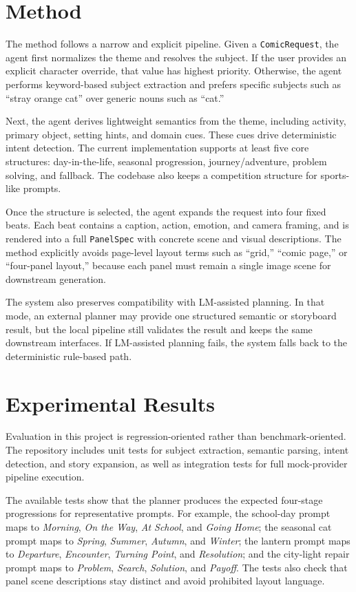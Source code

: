 \documentclass[11pt]{article}
\begin{document}
\section{Method}
The method follows a narrow and explicit pipeline. Given a \texttt{ComicRequest}, the agent first normalizes the theme and resolves the subject. If the user provides an explicit character override, that value has highest priority. Otherwise, the agent performs keyword-based subject extraction and prefers specific subjects such as ``stray orange cat'' over generic nouns such as ``cat.''

Next, the agent derives lightweight semantics from the theme, including activity, primary object, setting hints, and domain cues. These cues drive deterministic intent detection. The current implementation supports at least five core structures: day-in-the-life, seasonal progression, journey/adventure, problem solving, and fallback. The codebase also keeps a competition structure for sports-like prompts.

Once the structure is selected, the agent expands the request into four fixed beats. Each beat contains a caption, action, emotion, and camera framing, and is rendered into a full \texttt{PanelSpec} with concrete scene and visual descriptions. The method explicitly avoids page-level layout terms such as ``grid,'' ``comic page,'' or ``four-panel layout,'' because each panel must remain a single image scene for downstream generation.

The system also preserves compatibility with LM-assisted planning. In that mode, an external planner may provide one structured semantic or storyboard result, but the local pipeline still validates the result and keeps the same downstream interfaces. If LM-assisted planning fails, the system falls back to the deterministic rule-based path.

\section{Experimental Results}
Evaluation in this project is regression-oriented rather than benchmark-oriented. The repository includes unit tests for subject extraction, semantic parsing, intent detection, and story expansion, as well as integration tests for full mock-provider pipeline execution.

The available tests show that the planner produces the expected four-stage progressions for representative prompts. For example, the school-day prompt maps to \emph{Morning}, \emph{On the Way}, \emph{At School}, and \emph{Going Home}; the seasonal cat prompt maps to \emph{Spring}, \emph{Summer}, \emph{Autumn}, and \emph{Winter}; the lantern prompt maps to \emph{Departure}, \emph{Encounter}, \emph{Turning Point}, and \emph{Resolution}; and the city-light repair prompt maps to \emph{Problem}, \emph{Search}, \emph{Solution}, and \emph{Payoff}. The tests also check that panel scene descriptions stay distinct and avoid prohibited layout language.
\end{document}
